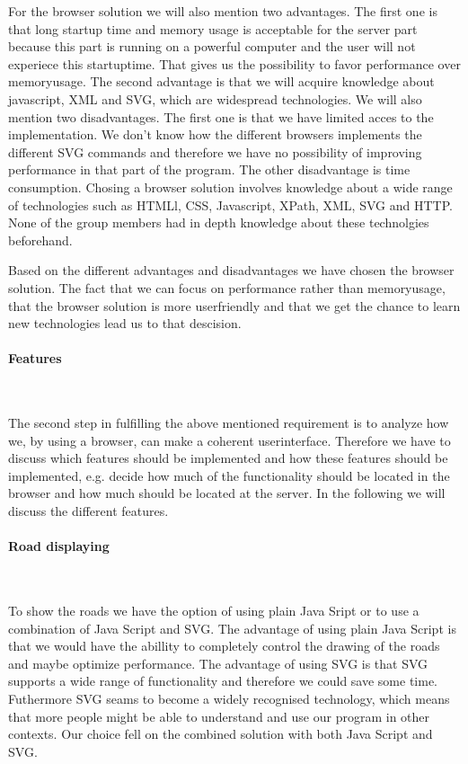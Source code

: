 \documentclass[a4paper,10pt,titlepage]{article}
\begin{document}
For the browser solution we will also mention two advantages. The first one is that long startup time and memory usage is acceptable for the server part because this part is running on a powerful computer and the user will not experiece this startuptime. That gives us the possibility to favor performance over memoryusage. The second advantage is that we will acquire knowledge about javascript, XML and SVG, which are widespread technologies. We will also mention two disadvantages. The first one is that we have limited acces to the implementation. We don't know how the different browsers implements the different SVG commands and therefore we have no possibility of improving performance in that part of the program. The other disadvantage is time consumption. Chosing a browser solution involves knowledge about a wide range of technologies such as HTMLl, CSS, Javascript, XPath, XML, SVG and HTTP. None of the group members had in depth knowledge about these technolgies beforehand.    

Based on the different advantages and disadvantages we have chosen the browser solution. The fact that we can focus on performance rather than memoryusage, that the browser solution is more userfriendly and that we get the chance to learn new technologies lead us to that descision.

\paragraph{Features}\mbox{}\

The second step in fulfilling the above mentioned requirement is to analyze how we, by using a browser, can make a coherent userinterface. Therefore we have to discuss which features should be implemented and how these features should be implemented, e.g. decide how much of the functionality should be located in the browser and how much should be located at the server. In the following we will discuss the different features.

\paragraph{Road displaying}\mbox{}\

To show the roads we have the option of using plain Java Sript or to use a combination of Java Script and SVG. The advantage of using plain Java Script is that we would have the abillity to completely control the drawing of the roads and maybe optimize performance. The advantage of using SVG is that SVG supports a wide range of functionality and therefore we could save some time. Futhermore SVG seams to become a widely recognised technology, which means that more people might be able to understand and use our program in other contexts. Our choice fell on the combined solution with both Java Script and SVG. 
 
\end{document}
